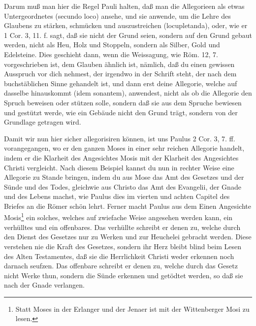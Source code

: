 Darum muß man hier die Regel Pauli halten, daß man die Allegorieen als etwas Untergeordnetes (secundo loco) ansehe, und sie anwende, um die Lehre des Glaubens zu stärken, schmücken und auszustreichen (locupletanda), oder, wie er 1 Cor. 3, 11. f. sagt, daß sie nicht der Grund seien, sondern auf den Grund gebaut werden, nicht als Heu, Holz und Stoppeln, sondern als Silber, Gold und Edelsteine. Dies geschieht dann, wenn die Weissagung, wie Röm. 12, 7. vorgeschrieben ist, dem Glauben ähnlich ist, nämlich, daß du einen gewissen Ausspruch vor dich nehmest, der irgendwo in der Schrift steht, der nach dem buchstäblichen Sinne gehandelt ist, und dann erst deine Allegorie, welche auf dasselbe hinauskommt (idem sonantem), anwendest, nicht als ob die Allegorie den Spruch beweisen oder stützen solle, sondern daß sie aus dem Spruche bewiesen und gestützt werde, wie ein Gebäude nicht den Grund trägt, sondern von der Grundlage getragen wird.

Damit wir nun hier sicher allegorisiren können, ist uns Paulus 2 Cor. 3, 7. ff. vorangegangen, wo er den ganzen Moses in einer sehr reichen Allegorie handelt, indem er die Klarheit des Angesichtes Mosis mit der Klarheit des Angesichtes Christi vergleicht. Nach diesem Beispiel kannst du nun in rechter Weise eine Allegorie zu Stande bringen, indem du aus Mose das Amt des Gesetzes und der Sünde und des Todes, gleichwie aus Christo das Amt des Evangelii, der Gnade und des Lebens machst, wie Paulus dies im vierten und achten Capitel des Briefes an die Römer schön lehrt. Ferner macht Paulus aus dem Einen Angesichte Mosis\footnote{Statt Moses in der Erlanger und der Jenaer ist mit der Wittenberger Mosi zu lesen.} ein solches, welches auf zwiefache Weise angesehen werden kann, ein verhülltes und ein offenbares. Das verhüllte schreibt er denen zu, welche durch den Dienst des Gesetzes nur zu Werken und zur Heuchelei gebracht werden. Diese verstehen nie die Kraft des Gesetzes, sondern ihr Herz bleibt blind beim Lesen des Alten Testamentes, daß sie die Herrlichkeit Christi weder erkennen noch darnach seufzen. Das offenbare schreibt er denen zu, welche durch das Gesetz nicht Werke thun, sondern die Sünde erkennen und getödtet werden, so daß sie nach der Gnade verlangen.

